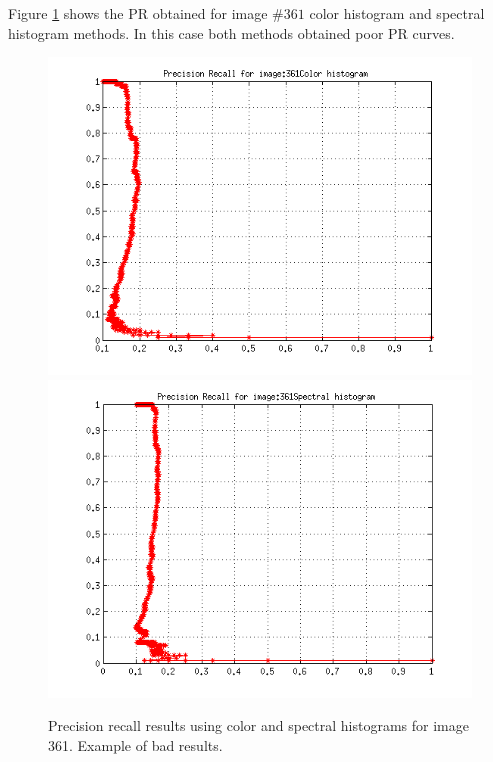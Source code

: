 \documentclass[a4paper,12pt]{article}
\begin{document}
Figure \ref{fig:bad} shows the PR obtained for image $\#361$ color histogram and spectral histogram methods. In this case both methods obtained poor PR curves.
\begin{figure}[h!]
    \centering
    \includegraphics[totalheight=.24\textheight]{../Results/PR/BadColor.png}
    \includegraphics[totalheight=.24\textheight]{../Results/PR/BadSpectral.png}
    \caption{Precision recall results using color and spectral histograms 
    for image 361. Example of bad results. }
    \label{fig:bad}
\end{figure}
\end{document}

